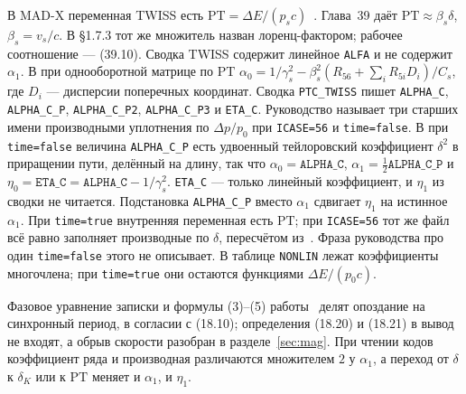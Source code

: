 В MAD-X переменная TWISS есть $\mathrm{PT}=\Delta E/(p_s c)$~\cite{MADX}. Глава~39 даёт $\mathrm{PT}\approx\beta_s\delta$, $\beta_s=v_s/c$. В \S1.7.3 тот же множитель назван лоренц-фактором; рабочее соотношение --- (39.10). Сводка TWISS содержит линейное \texttt{ALFA} и не содержит $\alpha_1$. В  при однооборотной матрице по $\mathrm{PT}$
$\alpha_0=1/\gamma_s^2-\beta_s^2(R_{56}+\sum_i R_{5i}D_i)/C_s$,
где $D_i$ --- дисперсии поперечных координат. Сводка \texttt{PTC\_TWISS} пишет \texttt{ALPHA\_C}, \texttt{ALPHA\_C\_P}, \texttt{ALPHA\_C\_P2}, \texttt{ALPHA\_C\_P3} и \texttt{ETA\_C}. Руководство называет три старших имени производными уплотнения по $\Delta p/p_0$ при \texttt{ICASE=56} и \texttt{time=false}. В  при \texttt{time=false} величина \texttt{ALPHA\_C\_P} есть удвоенный тейлоровский коэффициент $\delta^2$ в приращении пути, делённый на длину, так что $\alpha_0=\texttt{ALPHA\_C}$, $\alpha_1=\tfrac12\texttt{ALPHA\_C\_P}$ и $\eta_0=\texttt{ETA\_C}=\texttt{ALPHA\_C}-1/\gamma_s^2$.
\texttt{ETA\_C} --- только линейный коэффициент, и $\eta_1$ из сводки не читается. Подстановка \texttt{ALPHA\_C\_P} вместо $\alpha_1$ сдвигает $\eta_1$ на истинное $\alpha_1$. При \texttt{time=true} внутренняя переменная есть $\mathrm{PT}$; при \texttt{ICASE=56} тот же файл всё равно заполняет производные по $\delta$, пересчётом из~\cite{Schmidt2018}. Фраза руководства про один \texttt{time=false} этого не описывает. В таблице \texttt{NONLIN} лежат коэффициенты многочлена; при \texttt{time=true} они остаются функциями $\Delta E/(p_0 c)$.

Фазовое уравнение записки и формулы (3)--(5) работы~\cite{Senichev2013} делят опоздание на синхронный период, в согласии с (18.10); определения (18.20) и (18.21) в вывод не входят, а обрыв скорости разобран в разделе~\ref{sec:mag}. При чтении кодов коэффициент ряда и производная различаются множителем $2$ у $\alpha_1$, а переход от $\delta$ к $\delta_K$ или к $\mathrm{PT}$ меняет и $\alpha_1$, и $\eta_1$.

